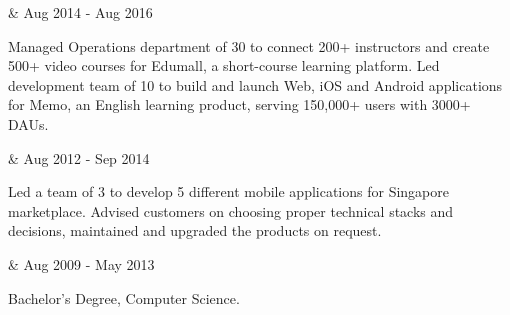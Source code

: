 \begin{workexp}
   \at \href{https://topica.asia/}{}  &
  Aug 2014 - Aug 2016 
\end{workexp}

\tbullet Managed Operations department of 30 to connect 200+ instructors and create 500+ video courses for Edumall, a short-course learning platform. \newline
\tbullet Led development team of 10 to build and launch Web, iOS and Android applications for Memo, an English learning product, serving 150,000+ users with 3000+ DAUs. \newline

\begin{workexp}
   \at \href{https://vinova.sg/}{}  &
  Aug 2012 - Sep 2014 
\end{workexp}

\tbullet Led a team of 3 to develop 5 different mobile applications for Singapore marketplace. \newline
\tbullet Advised customers on choosing proper technical stacks and decisions, maintained and upgraded the products on request. \newline

\begin{workexp}
   \at \href{https://e.uet.vnu.edu.vn}{} &
  Aug 2009 - May 2013 
\end{workexp}

\tbullet Bachelor's Degree, Computer Science.
